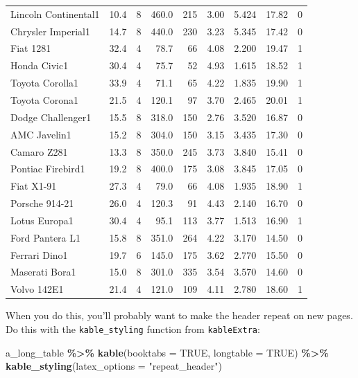 \documentclass[a4paper, nobind]{templates/ociamthesis}
\newenvironment{Shaded}{\begin{snugshade}}{\end{snugshade}}
\newcommand{\AttributeTok}[1]{\textcolor[rgb]{0.13,0.29,0.53}{#1}}
\newcommand{\ConstantTok}[1]{\textcolor[rgb]{0.56,0.35,0.01}{#1}}
\newcommand{\FunctionTok}[1]{\textcolor[rgb]{0.13,0.29,0.53}{\textbf{#1}}}
\newcommand{\NormalTok}[1]{#1}
\newcommand{\SpecialCharTok}[1]{\textcolor[rgb]{0.81,0.36,0.00}{\textbf{#1}}}
\newcommand{\StringTok}[1]{\textcolor[rgb]{0.31,0.60,0.02}{#1}}
\renewenvironment{Shaded}
{
  \vspace{10pt}%
  \begin{snugshade}%
}{%
  \end{snugshade}%
  \vspace{8pt}%
}
\begin{document}
\begin{longtable}{lrrrrrrrr}
Lincoln Continental1 & 10.4 & 8 & 460.0 & 215 & 3.00 & 5.424 & 17.82 & 0\\
Chrysler Imperial1 & 14.7 & 8 & 440.0 & 230 & 3.23 & 5.345 & 17.42 & 0\\
Fiat 1281 & 32.4 & 4 & 78.7 & 66 & 4.08 & 2.200 & 19.47 & 1\\
\addlinespace
Honda Civic1 & 30.4 & 4 & 75.7 & 52 & 4.93 & 1.615 & 18.52 & 1\\
Toyota Corolla1 & 33.9 & 4 & 71.1 & 65 & 4.22 & 1.835 & 19.90 & 1\\
Toyota Corona1 & 21.5 & 4 & 120.1 & 97 & 3.70 & 2.465 & 20.01 & 1\\
Dodge Challenger1 & 15.5 & 8 & 318.0 & 150 & 2.76 & 3.520 & 16.87 & 0\\
AMC Javelin1 & 15.2 & 8 & 304.0 & 150 & 3.15 & 3.435 & 17.30 & 0\\
\addlinespace
Camaro Z281 & 13.3 & 8 & 350.0 & 245 & 3.73 & 3.840 & 15.41 & 0\\
Pontiac Firebird1 & 19.2 & 8 & 400.0 & 175 & 3.08 & 3.845 & 17.05 & 0\\
Fiat X1-91 & 27.3 & 4 & 79.0 & 66 & 4.08 & 1.935 & 18.90 & 1\\
Porsche 914-21 & 26.0 & 4 & 120.3 & 91 & 4.43 & 2.140 & 16.70 & 0\\
Lotus Europa1 & 30.4 & 4 & 95.1 & 113 & 3.77 & 1.513 & 16.90 & 1\\
\addlinespace
Ford Pantera L1 & 15.8 & 8 & 351.0 & 264 & 4.22 & 3.170 & 14.50 & 0\\
Ferrari Dino1 & 19.7 & 6 & 145.0 & 175 & 3.62 & 2.770 & 15.50 & 0\\
Maserati Bora1 & 15.0 & 8 & 301.0 & 335 & 3.54 & 3.570 & 14.60 & 0\\
Volvo 142E1 & 21.4 & 4 & 121.0 & 109 & 4.11 & 2.780 & 18.60 & 1\\
\bottomrule
\end{longtable}

When you do this, you'll probably want to make the header repeat on new pages.
Do this with the \texttt{kable\_styling} function from \texttt{kableExtra}:

\begin{Shaded}
\begin{Highlighting}[]
\NormalTok{a\_long\_table }\SpecialCharTok{\%\textgreater{}\%} 
  \FunctionTok{kable}\NormalTok{(}\AttributeTok{booktabs =} \ConstantTok{TRUE}\NormalTok{, }\AttributeTok{longtable =} \ConstantTok{TRUE}\NormalTok{) }\SpecialCharTok{\%\textgreater{}\%} 
  \FunctionTok{kable\_styling}\NormalTok{(}\AttributeTok{latex\_options =} \StringTok{"repeat\_header"}\NormalTok{)}
\end{Highlighting}
\end{Shaded}
\end{document}
